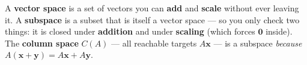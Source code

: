 \documentclass[10pt]{article}
\begin{document}
\vspace{0.10in}

\begin{remindbox}
\small A \textbf{vector space} is a set of vectors you can \textbf{add} and \textbf{scale} without
ever leaving it. A \textbf{subspace} is a subset that is itself a vector space --- so you only check
two things: it is closed under \textbf{addition} and under \textbf{scaling} (which forces
$\mathbf{0}$ inside). The \textbf{column space} $C(A)$ --- all reachable targets $A\mathbf{x}$ --- is
a subspace \emph{because} $A(\mathbf{x}+\mathbf{y})=A\mathbf{x}+A\mathbf{y}$.
\end{remindbox}
\end{document}
